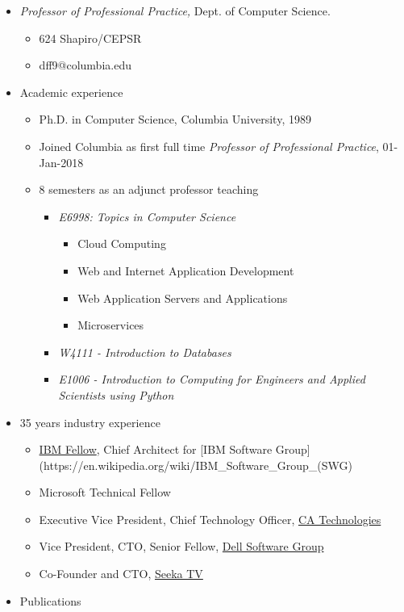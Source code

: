\documentclass[11pt]{article}
\providecommand{\tightlist}{%
      \setlength{\itemsep}{0pt}\setlength{\parskip}{0pt}}
\begin{document}
\begin{itemize}
\tightlist
\item
  \emph{Professor of Professional Practice,} Dept. of Computer Science.

  \begin{itemize}
  \tightlist
  \item
    624 Shapiro/CEPSR
  \item
    dff9@columbia.edu
  \end{itemize}
\item
  Academic experience

  \begin{itemize}
  \tightlist
  \item
    Ph.D. in Computer Science, Columbia University, 1989
  \item
    Joined Columbia as first full time \emph{Professor of Professional
    Practice}, 01-Jan-2018
  \item
    8 semesters as an adjunct professor teaching

    \begin{itemize}
    \tightlist
    \item
      \emph{E6998: Topics in Computer Science}

      \begin{itemize}
      \tightlist
      \item
        Cloud Computing
      \item
        Web and Internet Application Development
      \item
        Web Application Servers and Applications
      \item
        Microservices
      \end{itemize}
    \item
      \emph{W4111 - Introduction to Databases}
    \item
      \emph{E1006 - Introduction to Computing for Engineers and Applied
      Scientists using Python}
    \end{itemize}
  \end{itemize}
\item
  35 years industry experience

  \begin{itemize}
  \tightlist
  \item
    \href{https://en.wikipedia.org/wiki/IBM_Fellow}{IBM Fellow}, Chief
    Architect for {[}IBM Software
    Group{]}(https://en.wikipedia.org/wiki/IBM\_Software\_Group\_(SWG)
  \item
    Microsoft Technical Fellow
  \item
    Executive Vice President, Chief Technology Officer,
    \href{https://www.ca.com/us.html}{CA Technologies}
  \item
    Vice President, CTO, Senior Fellow,
    \href{https://en.wikipedia.org/wiki/Dell_Software}{Dell Software
    Group}
  \item
    Co-Founder and CTO, \href{https://seekatv.com/}{Seeka TV}
  \end{itemize}
\item
  Publications


\end{itemize}
\end{document}
